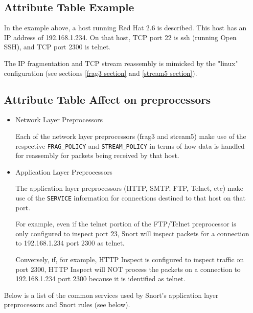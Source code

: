 \documentclass[english]{report}
\begin{document}
%
\subsection{Attribute Table Example}

In the example above, a host running Red Hat 2.6 is described. This host has
an IP address of 192.168.1.234.  On that host, TCP port 22 is ssh (running
Open SSH), and TCP port 2300 is telnet.

The IP fragmentation and TCP stream reassembly is mimicked by the "linux"
configuration (see sections \ref{frag3 section} and \ref{stream5 section}).

%
\subsection{Attribute Table Affect on preprocessors}

\begin{itemize}

\item{Network Layer Preprocessors}

Each of the network layer preprocessors (frag3 and stream5) make use of the
respective \texttt{FRAG\_POLICY} and \texttt{STREAM\_POLICY} in terms of
how data is handled for reassembly for packets being received by that host.

\item{Application Layer Preprocessors}

The application layer preprocessors (HTTP, SMTP, FTP, Telnet, etc) make use of
the \texttt{SERVICE} information for connections destined to that host on that
port.

For example, even if the telnet portion of the FTP/Telnet preprocessor is only
configured to inspect port 23, Snort will inspect packets for a connection to
192.168.1.234 port 2300 as telnet.

Conversely, if, for example, HTTP Inspect is configured to inspect traffic on
port 2300, HTTP Inspect will NOT process the packets on a connection to
192.168.1.234 port 2300 because it is identified as telnet.

\end{itemize}

Below is a list of the common services used by Snort's application layer
preprocessors and Snort rules (see below).
\end{document}
